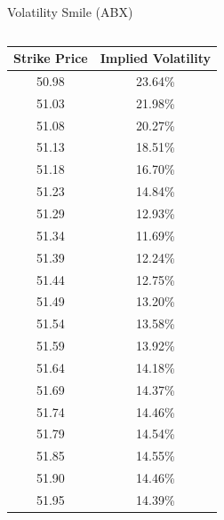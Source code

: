 \documentclass{beamer}
\begin{document}
\begin{frame}[shrink=50]{{\color{cyan}Volatility Smile ({\color{magenta}ABX})}}
\bigskip
\begin{columns}

\begin{column}{0.3\textwidth}
\begin{table}[H]
\begin{center}
\begin{tabular}{cc}
\hline 
\textbf{Strike Price}	& \textbf{Implied Volatility}\\
\hline \hline
50.98	& 23.64\%\\
51.03	& 21.98\%\\
51.08	& 20.27\%\\
51.13	& 18.51\%\\
51.18	& 16.70\%\\
51.23	& 14.84\%\\
51.29	& 12.93\%\\
{\color{orange}51.34}	& 11.69\%\\
51.39	& 12.24\%\\
51.44	& 12.75\%\\
51.49	& 13.20\%\\
51.54	& 13.58\%\\
51.59	& 13.92\%\\
51.64	& 14.18\%\\
51.69	& 14.37\%\\
51.74	& 14.46\%\\
51.79	& 14.54\%\\
51.85	& 14.55\%\\
51.90	& 14.46\%\\
51.95	& 14.39\%\\
\hline 
\end{tabular}
\label{tab:ABX_volatility_smile}
\end{center} 
\end{table} 
\end{column}


\end{columns}
\end{frame}
\end{document}
